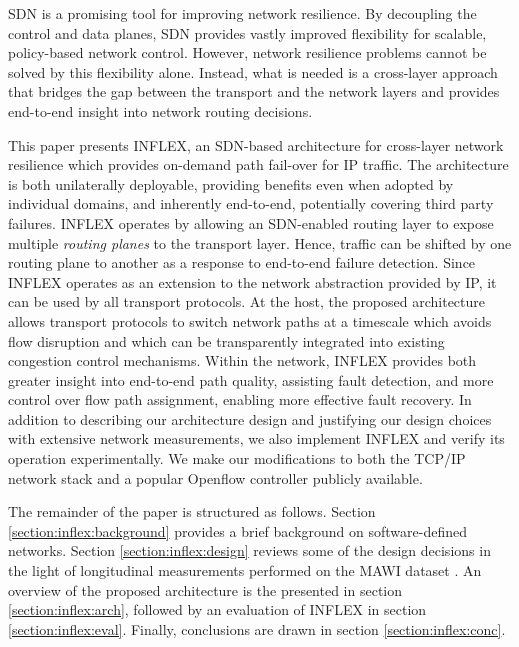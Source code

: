\ac{SDN} \cite{McKeown:2008:OEI:1355734.1355746} is a promising tool for improving network resilience. By decoupling the control and data planes, \ac{SDN} provides vastly improved flexibility for scalable, policy-based network control. 
However, network resilience problems cannot be solved by this flexibility alone. 
Instead, what is needed is a cross-layer approach that bridges the gap between the transport and the network layers and provides end-to-end insight into network routing decisions.

This paper presents INFLEX, an \ac{SDN}-based architecture for cross-layer network resilience which provides on-demand path fail-over for \ac{IP} traffic. 
The architecture is both unilaterally deployable, providing benefits even when adopted by individual domains, and inherently end-to-end, potentially covering third party failures.
INFLEX operates by allowing an \ac{SDN}-enabled routing layer to expose multiple \emph{routing planes} to the transport layer. 
Hence, traffic can be shifted by one routing plane to another as a response to end-to-end failure detection.
Since INFLEX operates as an extension to the network abstraction provided by \ac{IP}, it can be used by all transport protocols.
At the host, the proposed architecture allows transport protocols to switch network paths at a timescale which avoids flow disruption and which can be transparently integrated into existing congestion control mechanisms.
Within the network, INFLEX provides both greater insight into end-to-end path quality, assisting fault detection, and more control over flow path assignment, enabling more effective fault recovery. 
In addition to describing our architecture design and justifying our design choices with extensive network measurements, we also implement INFLEX and verify its operation experimentally. 
We make our modifications to both the \ac{TCP}/\ac{IP} network stack and a popular Openflow controller \cite{pox} publicly available.

The remainder of the paper is structured as follows.
Section \ref{section:inflex:background} provides a brief background on software-defined networks.
Section \ref{section:inflex:design} reviews some of the design decisions in the light of longitudinal measurements performed on the MAWI dataset \cite{mawi}.
An overview of the proposed architecture is the presented in section \ref{section:inflex:arch}, followed by an evaluation of INFLEX in section \ref{section:inflex:eval}.
Finally, conclusions are drawn in section \ref{section:inflex:conc}.

